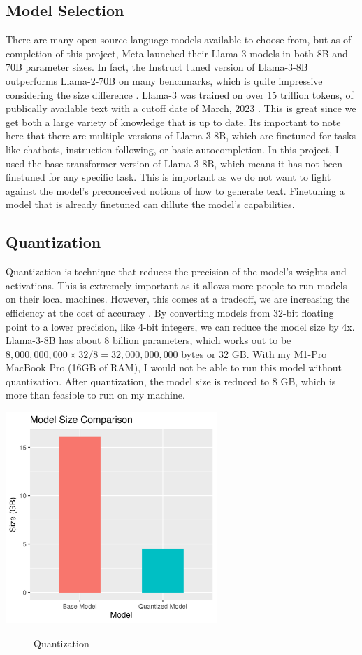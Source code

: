 \documentclass[12pt]{article}
\begin{document}
\subsection{Model Selection}
There are many open-source language models available to choose from, but as of completion of this project, Meta launched their Llama-3 models in both 8B and 70B parameter sizes. In fact, the Instruct tuned version of Llama-3-8B outperforms Llama-2-70B on many benchmarks, which is quite impressive considering the size difference \cite{llama3}. Llama-3 was trained on over 15 trillion tokens, of publically available text with a cutoff date of March, 2023 \cite{llama3}. This is great since we get both a large variety of knowledge that is up to date. Its important to note here that there are multiple versions of Llama-3-8B, which are finetuned for tasks like chatbots, instruction following, or basic autocompletion. In this project, I used the base transformer version of Llama-3-8B, which means it has not been finetuned for any specific task. This is important as we do not want to fight against the model's preconceived notions of how to generate text. Finetuning a model that is already finetuned can dillute the model's capabilities. 

\subsection{Quantization}
Quantization is technique that reduces the precision of the model's weights and activations. This is extremely important as it allows more people to run models on their local machines. However, this comes at a tradeoff, we are increasing the efficiency at the cost of accuracy \cite{wenqi}. By converting models from 32-bit floating point to a lower precision, like 4-bit integers, we can reduce the model size by 4x. Llama-3-8B has about 8 billion parameters, which works out to be $8,000,000,000 \times 32 / 8 = 
32,000,000,000$ bytes or $32$ GB. With my M1-Pro MacBook Pro (16GB of RAM), I would not be able to run this model without quantization. After quantization, the model size is reduced to $8$ GB, which is more than feasible to run on my machine.
\begin{center}
    \includegraphics[width=0.6\textwidth]{../Visuals/ModelSize.png}
    \begin{figure}
        \caption{Quantization}
    \end{figure}
\end{center}
\end{document}
